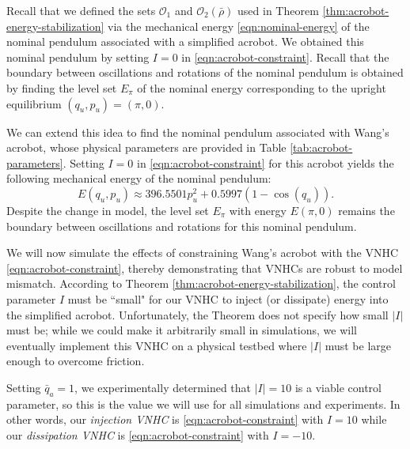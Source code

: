 \documentclass[journal,twoside,web]{ieeecolor}
\begin{document}
{Recall that we defined the sets \(\mathcal{O}_1\) and
\(\mathcal{O}_2(\bar{\rho})\) used in Theorem \ref{thm:acrobot-energy-stabilization}
via the mechanical energy \eqref{eqn:nominal-energy} of the nominal
pendulum associated with a simplified acrobot.
We obtained this nominal pendulum by setting \(I = 0\) in
\eqref{eqn:acrobot-constraint}.
Recall that the boundary between oscillations and rotations of the nominal
pendulum is obtained by finding the level set \(E_\pi\) of the nominal energy
corresponding to the upright equilibrium \((q_u,p_u) = (\pi,0)\).

We can extend this idea to find the nominal pendulum associated with Wang's
acrobot, whose physical parameters are provided in Table
\ref{tab:acrobot-parameters}.
Setting \(I = 0\) in \eqref{eqn:acrobot-constraint} for this acrobot
yields the following mechanical energy of the nominal pendulum:
\[
    E(q_u,p_u) \approx 396.5501 p_u^2 + 0.5997(1 - \cos(q_u))
    .
\]
Despite the change in model, the level set \(E_\pi\) with energy 
\(E(\pi,0)\) remains the boundary between oscillations and rotations
for this nominal pendulum.

We will now simulate the effects of constraining Wang's acrobot with the VNHC
\eqref{eqn:acrobot-constraint}, thereby demonstrating that VNHCs are robust to
model mismatch.
According to Theorem \ref{thm:acrobot-energy-stabilization}, the control
parameter \(I\) must be ``small" for our VNHC to inject (or dissipate) energy
into the simplified acrobot. 
Unfortunately, the Theorem does not specify how small \(|I|\) must be;
while we could make it arbitrarily small in simulations, we will eventually
implement this VNHC on a physical testbed where \(|I|\) must be large enough to
overcome friction.

Setting \(\bar{q}_a = 1\), we experimentally determined that \(|I| = 10\) is a
viable control parameter, so this is the value we will use for all simulations
and experiments.
In other words, our \textit{injection VNHC} is \eqref{eqn:acrobot-constraint} with 
\(I = 10\) while our \textit{dissipation VNHC} is \eqref{eqn:acrobot-constraint} with 
\(I = -10\).

\begin{table}
    \centering
    \caption{Physical parameters for the real acrobot.}
    \label{tab:acrobot-parameters}
\end{table}

}
\end{document}
